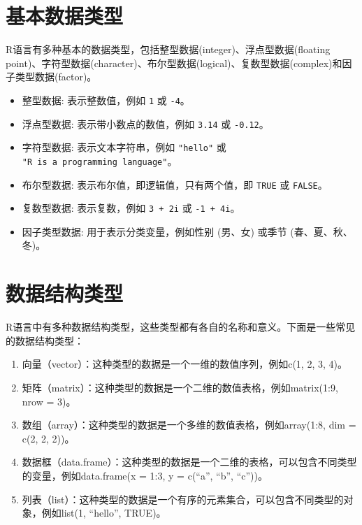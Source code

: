 \documentclass[
  letterpaper,
  DIV=11,
  numbers=noendperiod]{scrreprt}
\providecommand{\tightlist}{%
  \setlength{\itemsep}{0pt}\setlength{\parskip}{0pt}}\usepackage{longtable,booktabs,array}
\begin{document}
\section{基本数据类型}\label{ux57faux672cux6570ux636eux7c7bux578b}

R语言有多种基本的数据类型，包括整型数据(integer)、浮点型数据(floating
point)、字符型数据(character)、布尔型数据(logical)、复数型数据(complex)和因子类型数据(factor)。

\begin{itemize}
\tightlist
\item
  整型数据: 表示整数值，例如 \texttt{1} 或 \texttt{-4}。
\item
  浮点型数据: 表示带小数点的数值，例如 \texttt{3.14} 或 \texttt{-0.12}。
\item
  字符型数据: 表示文本字符串，例如 \texttt{"hello"} 或
  \texttt{"R\ is\ a\ programming\ language"}。
\item
  布尔型数据: 表示布尔值，即逻辑值，只有两个值，即 \texttt{TRUE} 或
  \texttt{FALSE}。
\item
  复数型数据: 表示复数，例如 \texttt{3\ +\ 2i} 或 \texttt{-1\ +\ 4i}。
\item
  因子类型数据: 用于表示分类变量，例如性别 (男、女) 或季节
  (春、夏、秋、冬)。
\end{itemize}

\section{数据结构类型}\label{ux6570ux636eux7ed3ux6784ux7c7bux578b}

R语言中有多种数据结构类型，这些类型都有各自的名称和意义。下面是一些常见的数据结构类型：

\begin{enumerate}
\def\labelenumi{\arabic{enumi}.}
\item
  向量（vector）：这种类型的数据是一个一维的数值序列，例如c(1, 2, 3,
  4)。
\item
  矩阵（matrix）：这种类型的数据是一个二维的数值表格，例如matrix(1:9,
  nrow = 3)。
\item
  数组（array）：这种类型的数据是一个多维的数值表格，例如array(1:8, dim
  = c(2, 2, 2))。
\item
  数据框（data.frame）：这种类型的数据是一个二维的表格，可以包含不同类型的变量，例如data.frame(x
  = 1:3, y = c(``a'', ``b'', ``c''))。
\item
  列表（list）：这种类型的数据是一个有序的元素集合，可以包含不同类型的对象，例如list(1,
  ``hello'', TRUE)。
\end{enumerate}
\end{document}
